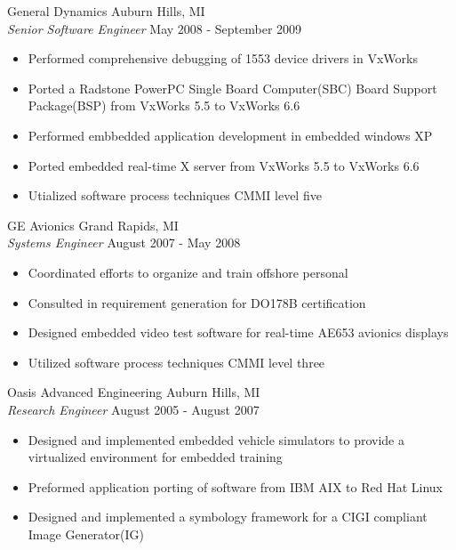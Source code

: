 \documentclass[line]{res}
\begin{document}
\begin{resume}
    \vspace{-2mm}
    General Dynamics \hfill Auburn Hills, MI\\
    {\sl Senior Software Engineer} \hfill May 2008 - September 2009
    \vspace{1mm}
    \begin{itemize} 
       \item Performed comprehensive debugging of 1553 device drivers in VxWorks
       \item Ported a Radstone PowerPC Single Board Computer(SBC) Board Support
       Package(BSP) from VxWorks 5.5 to VxWorks 6.6
       \item Performed embbedded application development in embedded windows XP
       \item Ported embedded real-time X server from VxWorks 5.5 to VxWorks 6.6
       \item Utialized software process techniques CMMI level five
    \end{itemize}

    \vspace{-2mm}
    GE Avionics \hfill Grand Rapids, MI\\
    {\sl Systems Engineer} \hfill August 2007 - May 2008
    \vspace{1mm}
    \begin{itemize} 
      \item Coordinated efforts to organize and train offshore personal
      \item Consulted in requirement generation for DO178B certification
      \item Designed embedded video test software for real-time AE653 avionics
      displays  
      \item Utilized software process techniques CMMI level three
    \end{itemize}

    \vspace{-2mm}
    Oasis Advanced Engineering \hfill Auburn Hills, MI\\
    {\sl Research Engineer} \hfill August 2005 - August 2007
    \vspace{1mm}
    \begin{itemize} 
      \item Designed and implemented embedded vehicle simulators to 
      provide a virtualized environment for embedded training  
      \item Preformed application porting of software from IBM AIX to Red Hat
      Linux
      \item Designed and implemented a symbology framework for a CIGI compliant
      Image Generator(IG)
    \end{itemize}


\end{resume}
\end{document}
